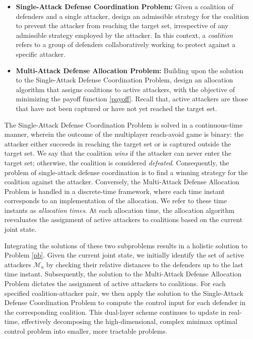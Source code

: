 \documentclass[journal]{IEEEtran}
\newcommand{\M}{\mathcal{M}}
\newcommand{\1}{\mathbf{1}}
\begin{document}
\begin{itemize}
    \item \textbf{Single-Attack Defense Coordination Problem:}
    Given a coalition of defenders and a single attacker, design an admissible strategy for the coalition to prevent the attacker from reaching the target set, irrespective of any admissible strategy employed by the attacker. In this context, a \textit{coalition} refers to a group of defenders collaboratively working to protect against a specific attacker.
    \item \textbf{Multi-Attack Defense Allocation Problem:} Building upon the solution to the Single-Attack Defense Coordination Problem, design an allocation algorithm that assigns coalitions to active attackers, with the objective of minimizing the payoff function \eqref{payoff}. Recall that, active attackers are those that have not been captured or have not yet reached the target set.
\end{itemize}

The Single-Attack Defense Coordination Problem is solved in a continuous-time manner, wherein the outcome of the multiplayer reach-avoid game is binary: the attacker either succeeds in reaching the target set or is captured outside the target set. We say that the coalition \textit{wins} if the attacker can never enter the target set; otherwise, the coalition is considered \textit{defeated}. Consequently, the problem of single-attack defense coordination is to find a winning strategy for the coalition against the attacker. Conversely, the Multi-Attack Defense Allocation Problem is handled in a discrete-time framework, where each time instant corresponds to an implementation of the allocation. We refer to these time instants as \textit{allocation times}. At each allocation time, the allocation algorithm reevaluates the assignment of active attackers to coalitions based on the current joint state. 

Integrating the solutions of these two subproblems results in a holistic solution to Problem \ref{pb}. Given the current joint state, we initially identify the set of active attackers $\M_a$ by checking their relative distances to the defenders up to the last time instant. Subsequently, the solution to the Multi-Attack Defense Allocation Problem dictates the assignment of active attackers to coalitions. For each specified coalition-attacker pair, we then apply the solution to the Single-Attack Defense Coordination Problem to compute the control input for each defender in the corresponding coalition. This dual-layer scheme continues to update in real-time, effectively decomposing the high-dimensional, complex minimax optimal control problem into smaller, more tractable problems. 
\end{document}
